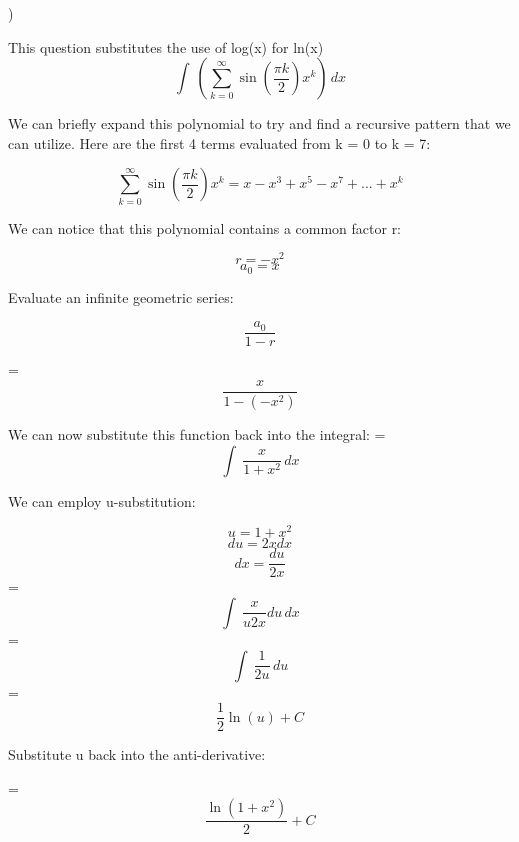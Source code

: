 \documentclass{article}
\begin{document}
) 
\begin{flushleft}
\noindent *This question substitutes the use of log(x) for ln(x)
\[ \int\ (\sum_{k=0}^{\infty} \sin(\frac{\pi k}{2}) x^k) \,dx \]

\noindent We can briefly expand this polynomial to try and find a recursive pattern that we can utilize. Here are the first 4 terms evaluated from k = 0 to k = 7:

\[\sum_{k=0}^{\infty} \sin(\frac{\pi k}{2}) x^k = x - x^3 +x^5-x^7+...+x^k\]

\noindent We can notice that this polynomial contains a common factor r:

\[r = -x^2\]
\[a_0 = x\]

\noindent Evaluate an infinite geometric series:

\[\frac{a_0}{1-r}\]

= \[\frac{x}{1-(-x^2)}\]

\noindent We can now substitute this function back into the integral:
=\[\int\ \frac{x}{1+x^2}\,dx\]

\noindent We can employ u-substitution:

\[u = 1+x^2\]
\[du = 2xdx\]
\[dx = \frac{du}{2x}\]
= \[\int\ \frac{x}{u2x}du\,dx\]
= \[\int\ \frac{1}{2u}\,du\]
= \[\frac{1}{2}\ln(u) + C\]

Substitute u back into the anti-derivative:

= \[\boxed{\frac{\ln(1+x^2)}{2} + C}\]
\end{flushleft}
\end{document}
